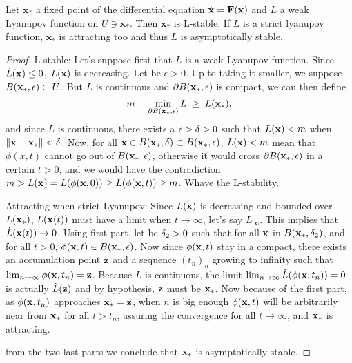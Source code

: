 \begin{theoreme} \label{th:Lianupov}
Let $\mathbf{x}_*$ a fixed point of the differential equation $\dot{\mathbf{x}} = \mathbf{F}(\mathbf{x})$ and $L$ a weak Lyanupov function on $U\ni\mathbf{x}_*$. Then $\mathbf{x}_*$ is L-stable. If $L$ is a strict lyanupov function, $\mathbf{x}_*$ is attracting too and thus $L$ is asymptotically stable.
\end{theoreme}
\begin{proof}
L-stable: Let's suppose first that $L$ is a weak Lyanupov function. Since $\dot{L}(\mathbf{x}) \leq 0$, $L(\mathbf{x})$ is decreasing. Let be $\epsilon>0$. Up to taking it smaller, we suppose $B(\mathbf{x}_*,\epsilon) \subset U$. But $L$ is continuous and $\partial B(\mathbf{x}_*,\epsilon)$ is compact, we can then define
\[m=\min_{\partial B(\mathbf{x}_*,\epsilon)}{L} \; \geq \; L(\mathbf{x}_*),\]
and since $L$ is continuous, there exists a $\epsilon>\delta>0$ such that $L(\mathbf{x})<m$ when $\|\mathbf{x}-\mathbf{x}_*\|<\delta$. Now, for all $\mathbf{x}\in B(\mathbf{x}_*,\delta) \subset B(\mathbf{x}_*,\epsilon)$, $L(\mathbf{x})<m$ mean that $\phi(x,t)$ cannot go out of $B(\mathbf{x}_*,\epsilon)$, otherwise it would cross $\partial B(\mathbf{x}_*,\epsilon)$ in a certain $t>0$, and  we would have the contradiction $m>L(\mathbf{x})=L(\phi(\mathbf{x},0)) \geq L(\phi(\mathbf{x},t)) \geq m$. Whave the L-stability.

Attracting when strict Lyanupov: Since $L(\mathbf{x})$ is decreasing and bounded over $L(\mathbf{x}_*)$, $L(\mathbf{x}(t))$ must have a limit when $t\to\infty$, let's say $L_{\infty}$. This implies that $\dot{L}(\mathbf{x}(t)) \to 0$. Using first part, let be $\delta_2>0$ such that for all $\mathbf{x}$ in $B(\mathbf{x}_*,\delta_2)$, and for all $t>0$, $\phi(\mathbf{x},t) \in B(\mathbf{x}_*,\epsilon)$. Now since $\phi(\mathbf{x},t)$ stay in a compact, there exists an accumulation point $\mathbf{z}$ and a sequence $(t_n)_n$ growing to infinity such that $\lim_{n\to\infty} \phi(\mathbf{x},t_n) = \mathbf{z}$. Because $\dot{L}$ is continuous, the limit $\lim_{n\to\infty} \dot{L}(\phi(\mathbf{x},t_n)) =0$ is actually $\dot{L}(\mathbf{z})$ and by hypothesis, $\mathbf{z}$ must be $\mathbf{x}_*$. Now because of the first part, as $\phi(\mathbf{x},t_n)$ approaches $\mathbf{x}_*=\mathbf{z}$, when $n$ is big enough $\phi(\mathbf{x},t)$ will be arbitrarily near from $\mathbf{x}_*$ for all $t>t_n$, assuring the convergence for all $t\to\infty$, and $\mathbf{x}_*$ is attracting.

from the two last parts we conclude that $\mathbf{x}_*$ is asymptotically stable.
\end{proof}

